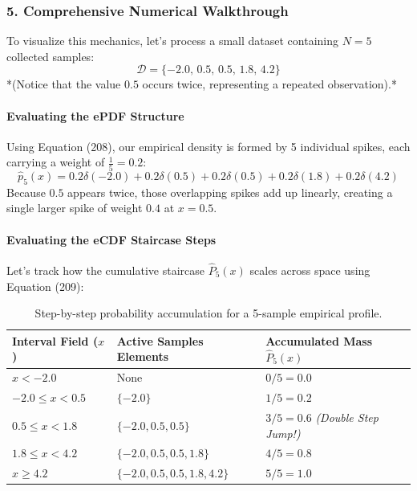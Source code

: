 \documentclass{article}
\begin{document}
\subsubsection*{5. Comprehensive Numerical Walkthrough}

To visualize this mechanics, let's process a small dataset containing $N = 5$ collected samples:
\begin{equation*}
\mathcal{D} = \{ -2.0, \, 0.5, \, 0.5, \, 1.8, \, 4.2 \}
\end{equation*}
*(Notice that the value $0.5$ occurs twice, representing a repeated observation).*

\paragraph{Evaluating the ePDF Structure}
Using Equation (208), our empirical density is formed by 5 individual spikes, each carrying a weight of $\frac{1}{5} = 0.2$:
\begin{equation*}
\hat{p}_5(x) = 0.2\delta(-2.0) + 0.2\delta(0.5) + 0.2\delta(0.5) + 0.2\delta(1.8) + 0.2\delta(4.2)
\end{equation*}
Because $0.5$ appears twice, those overlapping spikes add up linearly, creating a single larger spike of weight $0.4$ at $x = 0.5$.

\paragraph{Evaluating the eCDF Staircase Steps}
Let's track how the cumulative staircase $\hat{P}_5(x)$ scales across space using Equation (209):
\begin{table}[H]
\centering
\small
\renewcommand{\arraystretch}{1.4}
\begin{tabular}{lll}
\hline
\textbf{Interval Field ($x$)} & \textbf{Active Samples Elements} & \textbf{Accumulated Mass $\hat{P}_5(x)$} \\ \hline
$x < -2.0$ & None & $0 / 5 = \mathbf{0.0}$ \\
$-2.0 \le x < 0.5$ & $\{-2.0\}$ & $1 / 5 = \mathbf{0.2}$ \\
$0.5 \le x < 1.8$ & $\{-2.0, 0.5, 0.5\}$ & $3 / 5 = \mathbf{0.6}$ \textit{(Double Step Jump!)} \\
$1.8 \le x < 4.2$ & $\{-2.0, 0.5, 0.5, 1.8\}$ & $4 / 5 = \mathbf{0.8}$ \\
$x \ge 4.2$ & $\{-2.0, 0.5, 0.5, 1.8, 4.2\}$ & $5 / 5 = \mathbf{1.0}$ \\ \hline
\end{tabular}
\caption{Step-by-step probability accumulation for a 5-sample empirical profile.}
\label{tab:empirical_walkthrough}
\end{table}
\end{document}
